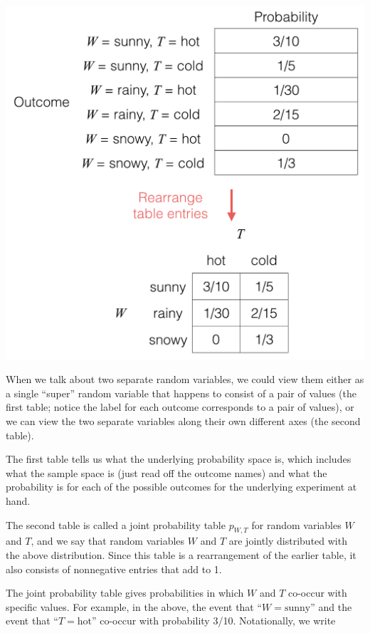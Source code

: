 \documentclass[6008notes.tex]{subfiles}
\begin{document}
{\centering\includegraphics[scale=0.4]{images_sec-joint-rv-rearrange-table}}

When we talk about two separate random variables, we could view them either as a single ``super'' random variable that happens to consist of a pair of values (the first table; notice the label for each outcome corresponds to a pair of values), or we can view the two separate variables along their own different axes (the second table).

The first table tells us what the underlying probability space is, which includes what the sample space is (just read off the outcome names) and what the probability is for each of the possible outcomes for the underlying experiment at hand.

The second table is called a joint probability table $p_{W,T}$ for random variables $W$ and $T$, and we say that random variables $W$ and $T$ are jointly distributed with the above distribution. Since this table is a rearrangement of the earlier table, it also consists of nonnegative entries that add to 1.

The joint probability table gives probabilities in which $W$ and $T$ co-occur with specific values. For example, in the above, the event that ``$W=\text {sunny}$'' and the event that ``$T=\text {hot}$'' co-occur with probability 3/10. Notationally, we write
\end{document}
